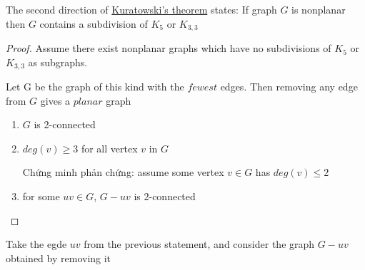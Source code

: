 The second direction of \hyperref[thr:kuratowski]{Kuratowski's theorem} states: If graph $G$ is nonplanar then $G$ contains a subdivision of $K_5$ or $K_{3,3}$
\begin{proof}
    Assume there exist nonplanar graphs which have no subdivisions of $K_5$ or $K_{3,3}$ as subgraphs.

    Let G be the graph of this kind with the $fewest$ edges. Then removing any edge from $G$ gives a $planar$ graph

    \begin{enumerate}
        \item $G$ is 2-connected
              \begin{multicols}{2}
              \end{multicols}
        \item $deg(v) \geq 3$ for all vertex $v$ in $G$

              Chứng minh phản chứng: assume some vertex $v \in G$ has $deg(v) \leq 2$

        \item for some $uv \in G$, $G - uv$ is 2-connected
    \end{enumerate}

\end{proof}

Take the egde $uv$ from the previous statement, and consider the graph $G-uv$ obtained by removing it

